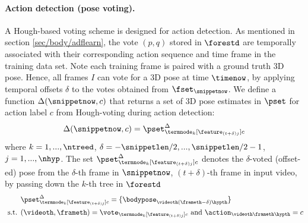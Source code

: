 \paragraph{Action detection (pose voting).}
A Hough-based voting scheme is designed for action detection. 
As mentioned in section \ref{sec/body/adflearn}, the vote $(p,q)$ stored in $\forestd$ are temporally associated with their corresponding action sequence and time frame in the training data set. Note each training frame is paired with a ground truth 3D pose. Hence, all frames $I$ can vote for a 3D pose at time $\timenow$, by applying temporal offsets  $\delta$ to the votes obtained from $\fset_{\snippetnow}$. We define a function $\Delta(\snippetnow,c)$ that returns a set of 3D pose estimates in $\pset$ for action label $c$ from Hough-voting during action detection: 
\begin{equation}
	\Delta(\snippetnow, c) = \pset^{\Delta}_{\termnode_{k}[\feature_{(t+\delta)j}]c}
\end{equation}
where $ k = 1,...,\ntreed$, $\delta = -\snippetlen/2,...,\snippetlen/2-1$, $j = 1,...,\nhyp$. The set $\pset^{\Delta}_{\termnode_{k}[\feature_{(t+\delta)j}]c}$ denotes the $\delta$-voted (offset-ed) pose from the $\delta$-th frame in $\snippetnow$, \ie $(t\!+\!\delta)$-th frame in input video, by passing down the $k$-th tree in $\forestd$
\begin{equation}
	\begin{split}
		& \pset^{\Delta}_{\termnode_{k}[\feature_{(t+\delta)j}]c} = \{\bodypose_{\videoth(\frameth-\delta)\hypth}\}\\ 
		\mbox{ s.t. } & (\videoth,\frameth) = \vote_{\termnode_{k}[\feature_{(t+\delta)j}]c} \mbox{ and } \action_{\videoth\frameth\hypth} = c 
\end{split} 
\end{equation} 

